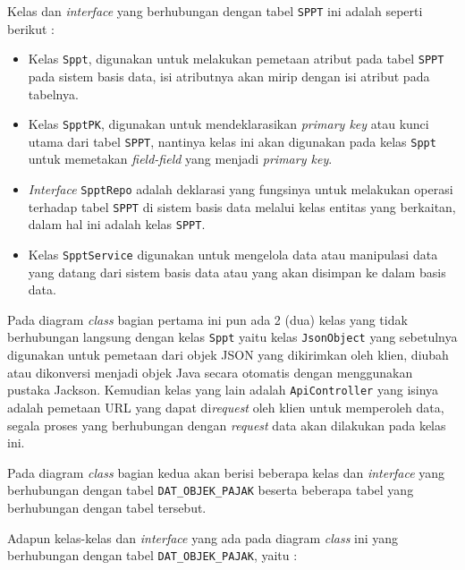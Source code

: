 Kelas dan \textit{interface} yang berhubungan dengan tabel \texttt{SPPT} ini adalah seperti berikut :

\begin{itemize}
	\item Kelas \texttt{Sppt}, digunakan untuk melakukan pemetaan atribut pada tabel \texttt{SPPT} pada sistem basis data, isi atributnya akan mirip dengan isi atribut pada tabelnya.
	\item Kelas \texttt{SpptPK}, digunakan untuk mendeklarasikan \textit{primary key} atau kunci utama dari tabel \texttt{SPPT}, nantinya kelas ini akan digunakan pada kelas \texttt{Sppt} untuk memetakan \textit{field-field} yang menjadi \textit{primary key}.
	\item \textit{Interface} \texttt{SpptRepo} adalah deklarasi yang fungsinya untuk melakukan operasi terhadap tabel \texttt{SPPT} di sistem basis data melalui kelas entitas yang berkaitan, dalam hal ini adalah kelas \texttt{SPPT}.
	\item Kelas \texttt{SpptService} digunakan untuk mengelola data atau manipulasi data yang datang dari sistem basis data atau yang akan disimpan ke dalam basis data.
\end{itemize}

Pada diagram \textit{class} bagian pertama ini pun ada 2 (dua) kelas yang tidak berhubungan langsung dengan kelas \texttt{Sppt} yaitu kelas \texttt{JsonObject} yang sebetulnya digunakan untuk pemetaan dari objek JSON yang dikirimkan oleh klien, diubah atau dikonversi menjadi objek Java secara otomatis dengan menggunakan pustaka Jackson. Kemudian kelas yang lain adalah \texttt{ApiController} yang isinya adalah pemetaan URL yang dapat di\textit{request} oleh klien untuk memperoleh data, segala proses yang berhubungan dengan \textit{request} data akan dilakukan pada kelas ini.

Pada diagram \textit{class} bagian kedua akan berisi beberapa kelas dan \textit{interface} yang berhubungan dengan tabel \texttt{DAT\_OBJEK\_PAJAK} beserta beberapa tabel yang berhubungan dengan tabel tersebut.

Adapun kelas-kelas dan \textit{interface} yang ada pada diagram \textit{class} ini yang berhubungan dengan tabel \texttt{DAT\_OBJEK\_PAJAK}, yaitu :

